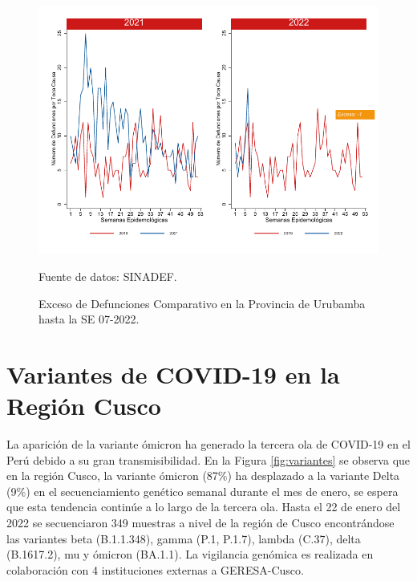 \documentclass[12pt,a4paper,openany]{book}
\begin{document}
		\begin{figure}[h]
			\caption{Exceso de Defunciones Comparativo en la Provincia de Urubamba hasta la SE 07-2022.}\label{fig:exceso_urub}
			\begin{center}
				\includegraphics[width=0.7\linewidth]{../figuras/exceso_13.pdf}
			\end{center}
			{\footnotesize {Fuente de datos: SINADEF.}}
		\end{figure}
		
		\clearpage
		
		\clearpage
		
		\section* {Variantes de COVID-19 en la Región Cusco}
		\noindent La aparición de la variante ómicron ha generado la tercera ola de COVID-19 en el Perú debido a su gran transmisibilidad. En la Figura \ref{fig:variantes} se observa que en la región Cusco, la variante ómicron (87$\%$) ha desplazado a la variante Delta (9$\%$) en el secuenciamiento genético semanal durante el mes de enero, se espera que esta tendencia continúe a lo largo de la tercera ola. 
		Hasta el 22 de enero del 2022 se secuenciaron 349 muestras a nivel de la región de Cusco 
		encontrándose las variantes beta (B.1.1.348), gamma (P.1, P.1.7), lambda (C.37), delta (B.1617.2), mu y ómicron (BA.1.1). 
		La vigilancia genómica es realizada en colaboración con 4 instituciones externas a GERESA-Cusco.
						
\end{document}
